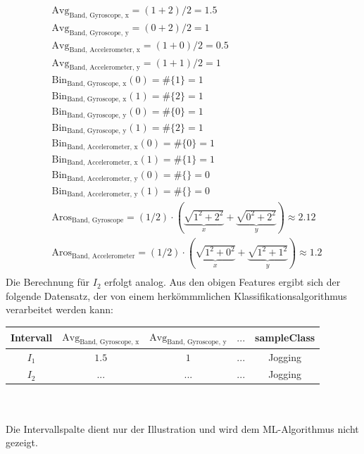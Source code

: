 \begin{align*}
&\text{Avg}_\text{Band, Gyroscope, x} = (1 + 2)/2 = 1.5 \\
&\text{Avg}_\text{Band, Gyroscope, y} = (0 + 2)/2 = 1 \\
&\text{Avg}_\text{Band, Accelerometer, x} = (1 + 0)/2 = 0.5 \\
&\text{Avg}_\text{Band, Accelerometer, y} = (1 + 1)/2 = 1 \\
&\text{Bin}_\text{Band, Gyroscope, x}(0) = \#\{1\} = 1 \\
&\text{Bin}_\text{Band, Gyroscope, x}(1) = \#\{2\} = 1 \\
&\text{Bin}_\text{Band, Gyroscope, y}(0) = \#\{0\} = 1 \\
&\text{Bin}_\text{Band, Gyroscope, y}(1) = \#\{2\} = 1 \\
&\text{Bin}_\text{Band, Accelerometer, x}(0) = \#\{0\} = 1 \\
&\text{Bin}_\text{Band, Accelerometer, x}(1) = \#\{1\} = 1 \\
&\text{Bin}_\text{Band, Accelerometer, y}(0) = \#\{\} = 0 \\
&\text{Bin}_\text{Band, Accelerometer, y}(1) = \#\{\} = 0 \\
&\text{Aros}_\text{Band, Gyroscope} = (1/2) \cdot (\underbrace{\sqrt{1^2 + 2^2}}_x + \underbrace{\sqrt{0^2 + 2^2}}_y) \approx 2.12 \\
&\text{Aros}_\text{Band, Accelerometer} = (1/2) \cdot (\underbrace{\sqrt{1^2 + 0^2}}_x + \underbrace{\sqrt{1^2 + 1^2}}_y) \approx 1.2 \\
\end{align*}
Die Berechnung für $I_2$ erfolgt analog. Aus den obigen Features ergibt sich der folgende Datensatz, der von einem herkömmmlichen Klassifikationsalgorithmus verarbeitet werden kann:\\

\begin{tabular}{|c|c|c|c|c|}
	\hline 
	Intervall & $\text{Avg}_\text{Band, Gyroscope, x}$ & $\text{Avg}_\text{Band, Gyroscope, y}$  & $...$  & sampleClass  \\ 
	\hline 
	$I_1$ & $1.5$ & $1$ & $...$ & Jogging \\ 
	\hline 
	$I_2$ & $...$ & $...$ & $...$ & Jogging   \\ 
	\hline 
\end{tabular} \\\\
Die Intervallspalte dient nur der Illustration und wird dem ML-Algorithmus nicht gezeigt.

